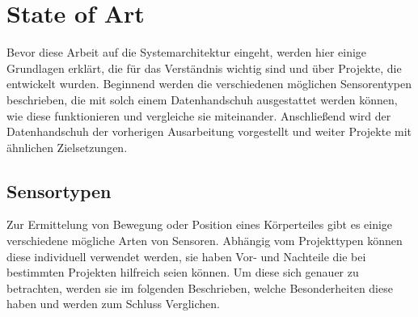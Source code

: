 \chapter{State of Art}
Bevor diese Arbeit auf die Systemarchitektur eingeht, werden hier einige Grundlagen erklärt, die für das Verständnis wichtig sind und über Projekte, die entwickelt wurden. Beginnend werden die verschiedenen möglichen Sensorentypen beschrieben, die mit solch einem Datenhandschuh ausgestattet werden können, wie diese funktionieren und vergleiche sie miteinander. 
Anschließend wird der Datenhandschuh der vorherigen Ausarbeitung vorgestellt und weiter Projekte mit ähnlichen Zielsetzungen.

\section{Sensortypen}
Zur Ermittelung von Bewegung oder Position eines Körperteiles gibt es einige verschiedene mögliche Arten von Sensoren. Abhängig vom Projekttypen können diese individuell verwendet werden, sie haben Vor- und Nachteile die bei bestimmten Projekten hilfreich seien können. Um diese sich genauer zu betrachten, werden sie im folgenden Beschrieben, welche Besonderheiten diese haben und werden zum Schluss Verglichen.

